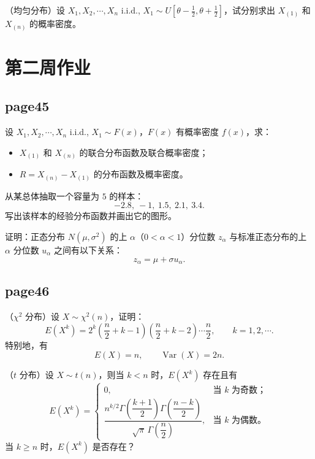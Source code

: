 \begin{homework}[3]
（均匀分布）设 $X_1,X_2,\cdots,X_n$ i.i.d., $X_1\sim U\!\left[\theta-\frac12,\theta+\frac12\right]$，试分别求出 $X_{(1)}$ 和 $X_{(n)}$ 的概率密度。
\end{homework}
\section{第二周作业}
\subsection*{page45}

\begin{homework}[4]
设 $X_1,X_2,\cdots,X_n$ i.i.d., $X_1\sim F(x)$，$F(x)$ 有概率密度 $f(x)$，求：
\begin{itemize}
    \item[(1)] $X_{(1)}$ 和 $X_{(n)}$ 的联合分布函数及联合概率密度；
    \item[(2)] $R=X_{(n)}-X_{(1)}$ 的分布函数及概率密度。
\end{itemize}
\end{homework}

\begin{homework}[5]
从某总体抽取一个容量为 $5$ 的样本：
\[
-2.8,\ -1,\ 1.5,\ 2.1,\ 3.4.
\]
写出该样本的经验分布函数并画出它的图形。
\end{homework}

\begin{homework}[6]
证明：正态分布 $N(\mu,\sigma^2)$ 的上 $\alpha$（$0<\alpha<1$）分位数 $z_\alpha$ 与标准正态分布的上 $\alpha$ 分位数 $u_\alpha$ 之间有以下关系：
\[
z_\alpha=\mu+\sigma u_\alpha.
\]
\end{homework}
\subsection*{page46}

\begin{homework}[1]
（$\chi^2$ 分布）设 $X\sim \chi^2(n)$，证明：
\[
E(X^k)=2^k\left(\frac n2+k-1\right)\left(\frac n2+k-2\right)\cdots \frac n2,
\qquad k=1,2,\cdots.
\]
特别地，有
\[
E(X)=n,\qquad \operatorname{Var}(X)=2n.
\]
\end{homework}

\begin{homework}[2]
（$t$ 分布）设 $X\sim t(n)$，则当 $k<n$ 时，$E(X^k)$ 存在且有
\[
E(X^k)=
\begin{cases}
0, & \text{当 } k \text{ 为奇数；}\\[1em]
\dfrac{n^{k/2}\Gamma\!\left(\dfrac{k+1}{2}\right)\Gamma\!\left(\dfrac{n-k}{2}\right)}
{\sqrt{\pi}\,\Gamma\!\left(\dfrac n2\right)}, & \text{当 } k \text{ 为偶数。}
\end{cases}
\]
当 $k\ge n$ 时，$E(X^k)$ 是否存在？
\end{homework}

